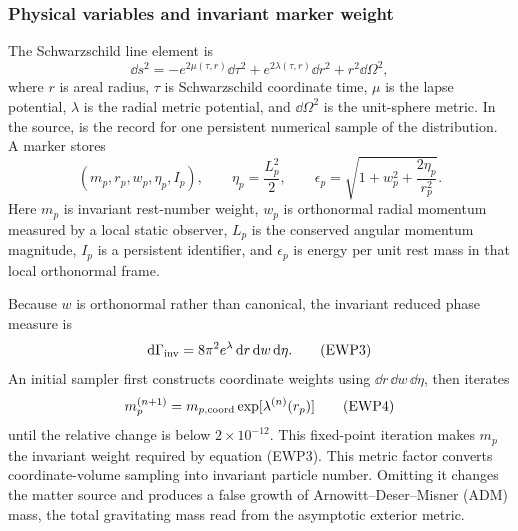 \subsubsection{Physical variables and invariant marker weight}

The Schwarzschild line element is
\[
 \dd s^2=-e^{2\mu(\tau,r)}\dd\tau^2
          +e^{2\lambda(\tau,r)}\dd r^2+r^2\dd\Omega^2,    \tag{EWP1}
\]
where \(r\) is areal radius, \(\tau\) is Schwarzschild coordinate time,
\(\mu\) is the lapse
potential, \(\lambda\) is the radial metric potential, and
\(\dd\Omega^2\) is the unit-sphere metric.  In the source,
 is the record for one persistent numerical sample of
the distribution.  A marker stores
\[
 (m_p,r_p,w_p,\eta_p,I_p),\qquad
 \eta_p=\frac{L_p^2}{2},\qquad
 \epsilon_p=\sqrt{1+w_p^2+\frac{2\eta_p}{r_p^2}}.        \tag{EWP2}
\]
Here \(m_p\) is invariant rest-number weight, \(w_p\) is orthonormal radial
momentum measured by a local static observer, \(L_p\) is the conserved
angular momentum magnitude, \(I_p\) is a persistent identifier, and
\(\epsilon_p\) is energy per unit rest mass in that local orthonormal frame.

Because \(w\) is orthonormal rather than canonical, the invariant reduced
phase measure is
\[
 \mathrm d\Gamma_{\rm inv}
 =8\pi^2 e^\lambda\,\mathrm d r\,\mathrm d w\,\mathrm d\eta.               \tag{EWP3}
\]
An initial sampler first constructs coordinate weights using
\(\dd r\,\dd w\,\dd\eta\), then iterates
\[
 m_p^{(n+1)}
 =m_{p,\rm coord}\exp[\lambda^{(n)}(r_p)]                \tag{EWP4}
\]
until the relative change is below \(2\times10^{-12}\).  This fixed-point
iteration makes \(m_p\) the invariant weight required by equation (EWP3).
This metric factor converts coordinate-volume sampling into invariant
particle number.  Omitting it changes the matter source and produces a false
growth of Arnowitt--Deser--Misner (ADM) mass, the total gravitating mass read
from the asymptotic exterior metric.

